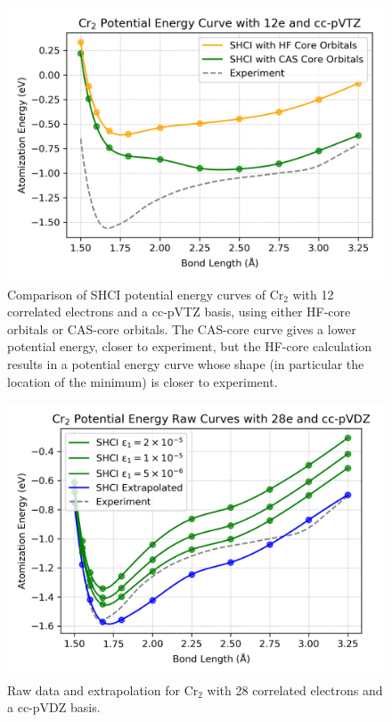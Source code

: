 \begin{figure}
  \begin{center}
  \includegraphics[width=0.9\linewidth]{figs/cashf.png}
  \caption{Comparison of SHCI potential energy curves of Cr$_2$ with 12 correlated electrons and a cc-pVTZ basis, using either HF-core orbitals or CAS-core orbitals.
  The CAS-core curve gives a lower potential energy, closer to experiment, but
  the HF-core calculation results in a potential energy curve whose shape (in particular the location of the minimum)
  is closer to experiment.
  }
  \label{fig:cashf}
  \end{center}
\end{figure}

\begin{figure}
  \begin{center}
  \includegraphics[width=0.9\linewidth]{figs/cr2raw.png}
  \caption{Raw data and extrapolation for Cr$_2$ with 28 correlated electrons and a cc-pVDZ basis.
  }
  \label{fig:cr2raw}
  \end{center}
\end{figure}

